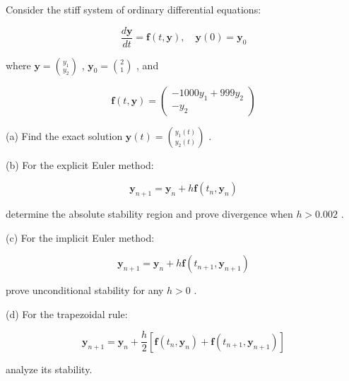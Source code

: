 \begin{exercise}
\label{applied:2025:6}
Consider the stiff system of ordinary differential equations:

\[
\frac {d \mathbf {y}}{d t} = \mathbf {f} (t, \mathbf {y}), \quad \mathbf {y} (0) = \mathbf {y} _ {0}
\]

where $\mathbf { y } = { \binom { y _ { 1 } } { y _ { 2 } } }$ , $\mathbf { y } _ { 0 } = { \binom { 2 } { 1 } }$ , and

\[
\mathbf {f} (t, \mathbf {y}) = \left( \begin{array}{c} - 1 0 0 0 y _ {1} + 9 9 9 y _ {2} \\ - y _ {2} \end{array} \right)
\]

(a) Find the exact solution $\mathbf { y } ( t ) = { \binom { y _ { 1 } ( t ) } { y _ { 2 } ( t ) } }$ .

(b) For the explicit Euler method:

\[
\mathbf {y} _ {n + 1} = \mathbf {y} _ {n} + h \mathbf {f} \left(t _ {n}, \mathbf {y} _ {n}\right)
\]

determine the absolute stability region and prove divergence when $h > 0 . 0 0 2$ .

(c) For the implicit Euler method:

\[
\mathbf {y} _ {n + 1} = \mathbf {y} _ {n} + h \mathbf {f} \left(t _ {n + 1}, \mathbf {y} _ {n + 1}\right)
\]

prove unconditional stability for any $h > 0$ .

(d) For the trapezoidal rule:

\[
\mathbf {y} _ {n + 1} = \mathbf {y} _ {n} + \frac {h}{2} [ \mathbf {f} (t _ {n}, \mathbf {y} _ {n}) + \mathbf {f} (t _ {n + 1}, \mathbf {y} _ {n + 1}) ]
\]

analyze its stability.
\end{exercise}

